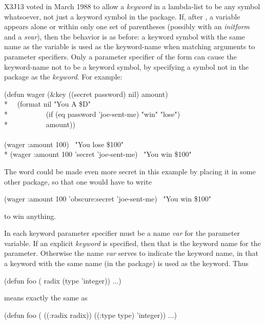\begin{newer}
X3J13 voted in March 1988 
to allow a \emph{keyword} in a lambda-list
to be any symbol whatsoever, not just a keyword symbol
in the  package.  If, after ,
a variable appears alone or within only one set of parentheses
(possibly with an \emph{initform} and a \emph{svar}), then
the behavior is as before: a keyword symbol with the same name as
the variable is used as the keyword-name when matching arguments
to parameter specifiers.  Only a parameter specifier of the form
 can cause the keyword-name
not to be a keyword symbol, by specifying a symbol not in the 
package as the \emph{keyword}.
For example:
\begin{lisp}
(defun wager (\&key ((secret password) nil) amount) \\*
~~(format nil "You {\Xtilde}A \${\Xtilde}D" \\*
~~~~~~~~~~(if (eq password 'joe-sent-me) "win" "lose") \\*
~~~~~~~~~~amount)) \\
\\
(wager :amount 100) \EV\ "You lose \$100" \\*
(wager :amount 100 'secret 'joe-sent-me) \EV\ "You win \$100"
\end{lisp}
The  word could be made even more secret in this example
by placing it in some other  package, so that one would
have to write
\begin{lisp}
(wager :amount 100 'obscure:secret 'joe-sent-me) \EV\ "You win \$100"
\end{lisp}
to win anything.
\end{newer}

In each keyword parameter specifier must be a name \emph{var} for the
parameter variable.  If an explicit \emph{keyword} is
specified, then that is the keyword name for the parameter.  Otherwise
the name \emph{var} serves to indicate the keyword name,
in that a keyword with the same name (in the  package) is used
as the keyword.  Thus
\begin{lisp}
(defun foo ( radix (type 'integer)) ...)
\end{lisp}
means exactly the same as
\begin{lisp}
(defun foo ( ((:radix radix)) ((:type type) 'integer)) ...)
\end{lisp}

